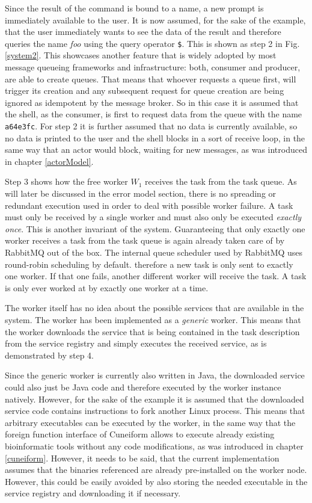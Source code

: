 Since the result of the command is bound to a name, a new
prompt is immediately available to the user. It is now assumed,
for the sake of the example, that the user immediately wants to
see the data of the result and therefore queries the name
\textit{foo} using the query operator \texttt{\$}. This is
shown as step 2 in Fig.\ref{system2}. This showcases another
feature that is widely adopted by most message queueing
frameworks and infrastructure: both, consumer and producer,
are able to create queues. That means that whoever requests
a queue first, will trigger its creation and any subsequent
request for queue creation are being ignored as idempotent
by the message broker. So in this case it is assumed that
the shell, as the consumer, is first to request data from the
queue with the name \texttt{a64e3fc}. For step 2 it is further
assumed that no data is currently available, so no data is
printed to the user and the shell blocks in a sort of
receive loop, in the same way that an actor would block, waiting
for new messages, as was introduced in chapter \ref{actorModel}.
\newline

Step 3 shows how the free worker $W_{1}$ receives the task from
the task queue. As will later be discussed in the error model
section, there is no spreading or redundant execution used in
order to deal with possible worker failure. A task must only
be received by a single worker and must also only be executed
\textit{exactly once}. This is another invariant of the system.
Guaranteeing that only exactly one worker receives a task
from the task queue is again already taken care of by RabbitMQ out
of the box. The internal queue scheduler used by RabbitMQ
uses round-robin scheduling by default. therefore a new task
is only sent to exactly one worker. If that one fails, another
different worker will receive the task. A task is only ever
worked at by exactly one worker at a time.

The worker itself has no idea about the possible services
that are available in the system. The worker has been implemented
as a \textit{generic} worker. This means that the worker downloads
the service that is being contained in the task description from
the service registry and simply executes the received service, as
is demonstrated by step 4.

Since the generic worker is currently also written in Java,
the downloaded service could also just be Java code and therefore
executed by the worker instance natively. However, for the sake
of the example it is assumed that the downloaded service code
contains instructions to fork another Linux process. This means
that arbitrary executables can be executed by the worker, in
the same way that the foreign function interface of Cuneiform
allows to execute already existing bioinformatic tools without
any code modifications, as was introduced in chapter \ref{cuneiform}.
However, it needs to be said, that the current implementation
assumes that the binaries referenced are
already pre-installed on the worker node. However, this could be
easily avoided by also storing the needed executable in the service
registry and downloading it if necessary.
\newline

